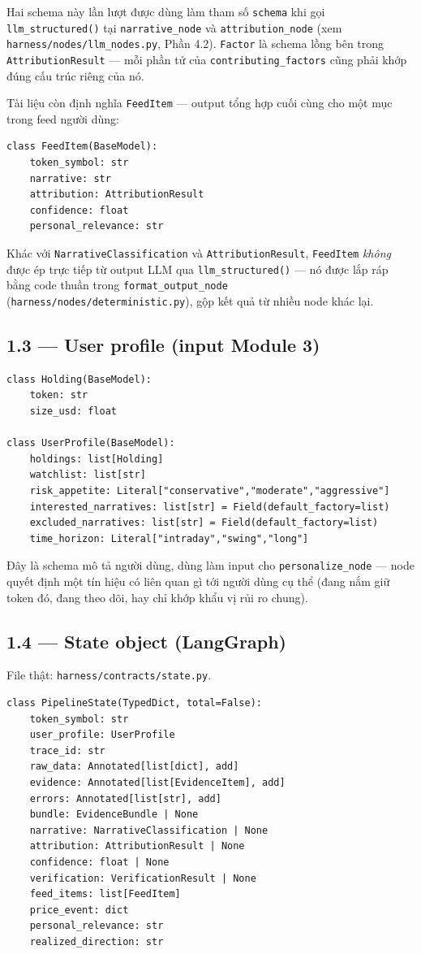 \documentclass[12pt,a4paper]{article}
\newcommand{\file}[1]{\texttt{#1}}
\begin{document}
Hai schema này lần lượt được dùng làm tham số \texttt{schema} khi gọi \texttt{llm\_structured()}
tại \texttt{narrative\_node} và \texttt{attribution\_node} (xem \file{harness/nodes/llm\_nodes.py},
Phần 4.2). \texttt{Factor} là schema lồng bên trong \texttt{AttributionResult} --- mỗi phần tử của
\texttt{contributing\_factors} cũng phải khớp đúng cấu trúc riêng của nó.

Tài liệu còn định nghĩa \texttt{FeedItem} --- output tổng hợp cuối cùng cho một mục trong feed
người dùng:
\begin{lstlisting}
class FeedItem(BaseModel):
    token_symbol: str
    narrative: str
    attribution: AttributionResult
    confidence: float
    personal_relevance: str
\end{lstlisting}
Khác với \texttt{NarrativeClassification} và \texttt{AttributionResult}, \texttt{FeedItem}
\emph{không} được ép trực tiếp từ output LLM qua \texttt{llm\_structured()} --- nó được lắp ráp
bằng code thuần trong \texttt{format\_output\_node} (\file{harness/nodes/deterministic.py}), gộp
kết quả từ nhiều node khác lại.

\subsection{1.3 --- User profile (input Module 3)}

\begin{lstlisting}
class Holding(BaseModel):
    token: str
    size_usd: float

class UserProfile(BaseModel):
    holdings: list[Holding]
    watchlist: list[str]
    risk_appetite: Literal["conservative","moderate","aggressive"]
    interested_narratives: list[str] = Field(default_factory=list)
    excluded_narratives: list[str] = Field(default_factory=list)
    time_horizon: Literal["intraday","swing","long"]
\end{lstlisting}

Đây là schema mô tả người dùng, dùng làm input cho \texttt{personalize\_node} --- node quyết định
một tín hiệu có liên quan gì tới người dùng cụ thể (đang nắm giữ token đó, đang theo dõi, hay chỉ
khớp khẩu vị rủi ro chung).

\subsection{1.4 --- State object (LangGraph)}

File thật: \file{harness/contracts/state.py}.

\begin{lstlisting}
class PipelineState(TypedDict, total=False):
    token_symbol: str
    user_profile: UserProfile
    trace_id: str
    raw_data: Annotated[list[dict], add]
    evidence: Annotated[list[EvidenceItem], add]
    errors: Annotated[list[str], add]
    bundle: EvidenceBundle | None
    narrative: NarrativeClassification | None
    attribution: AttributionResult | None
    confidence: float | None
    verification: VerificationResult | None
    feed_items: list[FeedItem]
    price_event: dict
    personal_relevance: str
    realized_direction: str
\end{lstlisting}
\end{document}
